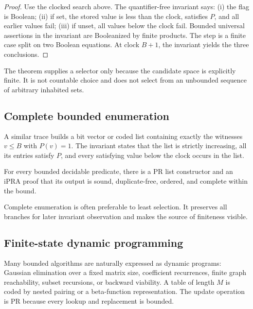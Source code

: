 \begin{proof}
Use the clocked search above.  The quantifier-free invariant says: (i) the flag
is Boolean; (ii) if set, the stored value is less than the clock, satisfies
\(P\), and all earlier values fail; (iii) if unset, all values below the clock
fail.  Bounded universal assertions in the invariant are Booleanized by finite
products.  The step is a finite case split on two Boolean equations.  At clock
\(B+1\), the invariant yields the three conclusions.
\end{proof}

The theorem supplies a selector only because the candidate space is explicitly
finite.  It is not countable choice and does not select from an unbounded
sequence of arbitrary inhabited sets.

\subsection{Complete bounded enumeration}

A similar trace builds a bit vector or coded list containing exactly the
witnesses \(v\le B\) with \(P(v)=1\).  The invariant states that the list is
strictly increasing, all its entries satisfy \(P\), and every satisfying value
below the clock occurs in the list.

\begin{theorem}\label{thm:enumeration}
For every bounded decidable predicate, there is a PR list constructor and an
iPRA proof that its output is sound, duplicate-free, ordered, and complete
within the bound.
\end{theorem}

Complete enumeration is often preferable to least selection.  It preserves all
branches for later invariant observation and makes the source of finiteness
visible.

\subsection{Finite-state dynamic programming}

Many bounded algorithms are naturally expressed as dynamic programs: Gaussian
elimination over a fixed matrix size, coefficient recurrences, finite graph
reachability, subset recursions, or backward viability.  A table of length
\(M\) is coded by nested pairing or a beta-function representation.  The update
operation is PR because every lookup and replacement is bounded.

